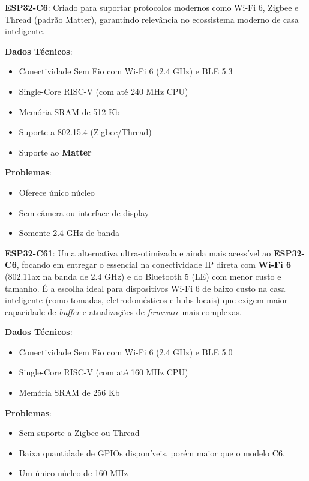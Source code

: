 \documentclass[a4paper,11pt]{article}
\begin{document}
\textbf{ESP32-C6}: Criado para suportar protocolos modernos como Wi-Fi 6, Zigbee e Thread (padrão Matter), garantindo relevância no ecossistema moderno de casa inteligente.  

\textbf{Dados Técnicos}: \vspace{-1em}
\begin{itemize}[nolistsep]
	\item Conectividade Sem Fio	com Wi-Fi 6 (2.4 GHz) e BLE 5.3
	\item Single-Core RISC-V (com até 240 MHz CPU)
	\item Memória SRAM de 512 Kb
	\item Suporte a 802.15.4 (Zigbee/Thread)
	\item Suporte ao \textbf{Matter}
\end{itemize}

\textbf{Problemas}: \vspace{-1em}
\begin{itemize}[nolistsep]
	\item Oferece único núcleo
	\item Sem câmera ou interface de display
	\item Somente 2.4 GHz de banda
\end{itemize}

\textbf{ESP32-C61}: Uma alternativa ultra-otimizada e ainda mais acessível ao \textbf{ESP32-C6}, focando em entregar o essencial na conectividade IP direta com \textbf{Wi-Fi 6} (802.11ax na banda de 2.4 GHz) e do Bluetooth 5 (LE) com menor custo e tamanho. É a escolha ideal para dispositivos Wi-Fi 6 de baixo custo na casa inteligente (como tomadas, eletrodomésticos e hubs locais) que exigem maior capacidade de \textit{buffer} e atualizações de \textit{firmware} mais complexas.

\textbf{Dados Técnicos}: \vspace{-1em}
\begin{itemize}[nolistsep]
	\item Conectividade Sem Fio	com Wi-Fi 6 (2.4 GHz) e BLE 5.0
	\item Single-Core RISC-V (com até 160 MHz CPU)
	\item Memória SRAM de 256 Kb
\end{itemize}

\textbf{Problemas}: \vspace{-1em}
\begin{itemize}[nolistsep]
	\item Sem suporte a Zigbee ou Thread
	\item Baixa quantidade de GPIOs disponíveis, porém maior que o modelo C6.
	\item Um único núcleo de 160 MHz
\end{itemize}
\end{document}
